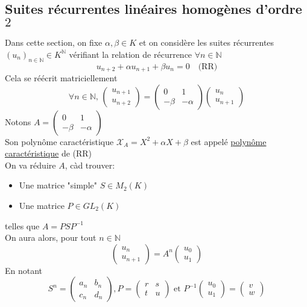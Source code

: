 \documentclass[10pt,a4paper]{article}
\theoremstyle{definition}
\begin{document}
\subsection{Suites récurrentes linéaires homogènes d'ordre $2$}
\noindent Dans cette section, on fixe $\alpha, \beta \in K$ et on considère les suites récurrentes $(u_n)_{n \in \mathbb{N}} \in K^\mathbb{N}$ vérifiant la relation de récurrence $\forall n \in \mathbb{N}$
\[u_{n + 2} + \alpha u_{n + 1} + \beta u_{n} = 0 \quad \text{(RR)}\]
Cela se réécrit matriciellement
\[ \forall n \in \mathbb{N},\, \begin{pmatrix}
u_{n + 1} \\
u_{n + 2}
\end{pmatrix} = \begin{pmatrix}
0 & 1 \\
-\beta & -\alpha
\end{pmatrix} \begin{pmatrix}
u_n \\
u_{n + 1}
\end{pmatrix} \]
Notons $A = \begin{pmatrix}
0 & 1 \\
-\beta & -\alpha
\end{pmatrix}$ \\
Son polynôme caractéristique $\mathcal{X}_A = X^2 + \alpha X + \beta$ est appelé \uline{polynôme caractéristique} de (RR) \\
On va réduire $A$, càd trouver:
\begin{itemize}
\item Une matrice "simple" $S \in M_2(K)$
\item Une matrice $P \in GL_2(K)$
\end{itemize}
telles que $A = PSP^{-1}$ \\
On aura alors, pour tout $n \in \mathbb{N}$
\[ \begin{pmatrix}
u_n \\
u_{n + 1}
\end{pmatrix} = A^n \begin{pmatrix}
u_0 \\
u_1
\end{pmatrix} \]
En notant
\[ S^n = \begin{pmatrix}
a_n & b_n \\
c_n & d_n
\end{pmatrix}, P = \begin{pmatrix}
r & s \\
t & u
\end{pmatrix} \text{ et } P^{-1} \begin{pmatrix}
u_0 \\
u_1
\end{pmatrix} = \begin{pmatrix}
v \\
w
\end{pmatrix} \]
\end{document}
